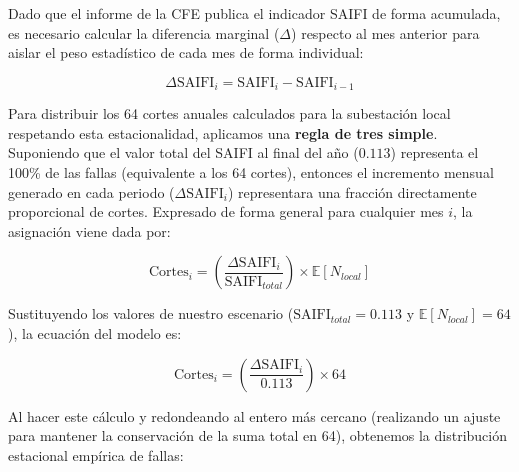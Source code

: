 \documentclass[
  spanish,
  letterpaper,
  DIV=11,
  numbers=noendperiod]{scrreprt}
\theoremstyle{plain}
\theoremstyle{definition}
\theoremstyle{remark}
\begin{document}
Dado que el informe de la CFE publica el indicador SAIFI de forma
acumulada, es necesario calcular la diferencia marginal (\(\Delta\))
respecto al mes anterior para aislar el peso estadístico de cada mes de
forma individual:

\[
\Delta \text{SAIFI}_i = \text{SAIFI}_i - \text{SAIFI}_{i-1}
\]

Para distribuir los 64 cortes anuales calculados para la subestación
local respetando esta estacionalidad, aplicamos una \textbf{regla de
tres simple}. Suponiendo que el valor total del SAIFI al final del año
(\(0.113\)) representa el 100\% de las fallas (equivalente a los 64
cortes), entonces el incremento mensual generado en cada periodo
(\(\Delta \text{SAIFI}_i\)) representara una fracción directamente
proporcional de cortes. Expresado de forma general para cualquier mes
\(i\), la asignación viene dada por:

\[
\text{Cortes}_i = \left( \frac{\Delta \text{SAIFI}_i}{\text{SAIFI}_{total}} \right) \times \mathbb{E}[N_{local}]
\]

Sustituyendo los valores de nuestro escenario
(\(\text{SAIFI}_{total} = 0.113\) y \(\mathbb{E}[N_{local}] = 64\)), la
ecuación del modelo es:

\[
\text{Cortes}_i = \left( \frac{\Delta \text{SAIFI}_i}{0.113} \right) \times 64
\]

Al hacer este cálculo y redondeando al entero más cercano (realizando un
ajuste para mantener la conservación de la suma total en 64), obtenemos
la distribución estacional empírica de fallas:
\end{document}
